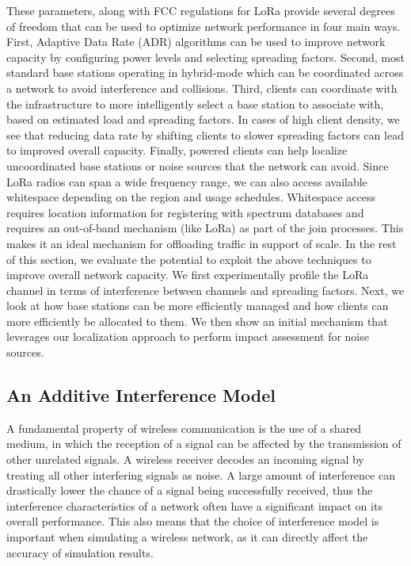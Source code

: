 These parameters, along with FCC regulations for LoRa provide several degrees of freedom that can be used to optimize network performance in four main ways.  First, Adaptive Data Rate (ADR) algorithms can be used to improve network capacity by configuring power levels and selecting spreading factors.  Second, most standard base stations operating in hybrid-mode which can be coordinated across a network to avoid interference and collisions.  Third, clients can coordinate with the infrastructure to more intelligently select a base station to associate with, based on estimated load and spreading factors. In cases of high client density, we see that reducing data rate by shifting clients to slower spreading factors can lead to improved overall capacity. Finally, powered clients can help localize uncoordinated base stations or noise sources that the network can avoid.   Since LoRa radios can span a wide frequency range, we can also access available whitespace depending on the region and usage schedules.  Whitespace access requires location information for registering with spectrum databases and requires an out-of-band mechanism (like LoRa) as part of the join processes.  This makes it an ideal mechanism for offloading traffic in support of scale.   In the rest of this section, we evaluate the potential to exploit the above techniques to improve overall network capacity. We first experimentally profile the LoRa channel in terms of interference between channels and spreading factors.  Next, we look at how base stations can be more efficiently managed and how clients can more efficiently be allocated to them.  We then show an initial mechanism that leverages our localization approach to perform impact assessment for noise sources.


\subsection{An Additive Interference Model}
\label{sec:AIM}

A fundamental property of wireless communication is the use of a shared medium, in which the reception of a signal can be affected by the transmission of other unrelated signals. A wireless receiver decodes an incoming signal by treating all other interfering signals as noise. A large amount of interference can drastically lower the chance of a signal being successfully received, thus the interference characteristics of a network often have a significant impact on its overall performance. This also means that the choice of interference model is important when simulating a wireless network, as it can directly affect the accuracy of simulation results.

